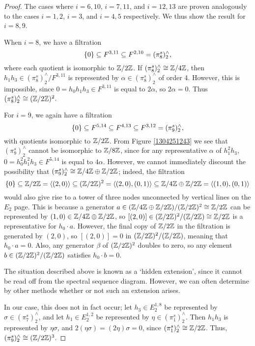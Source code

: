 \documentclass[11pt, titlepage]{article} %
\def\subq{\ensuremath\subseteq}
\def\inte{\ensuremath\mathbb{Z}}
\numberwithin{equation}{subsection}
\theoremstyle{plain}
\theoremstyle{definition}
\begin{document}
\begin{proof}
The cases where \(i=6,10\), \(i=7, 11\), and \(i=12,13\) are proven analogously to the cases \(i=1, 2\), \(i=3\), and \(i=4,5\) respectively. We thus show the result for \(i=8,9\).

When \(i=8\), we have a filtration
\[\{0\}\subq F^{3,11}\subq F^{2,10}=(\pi^s_8)^\wedge_2,\]
where each quotient is isomorphic to \(\inte/2\inte\). If \((\pi^s_8)^\wedge_2\cong \inte/4\inte\), then \(h_1h_3\in (\pi^s_8)^\wedge_2/F^{3,11}\) is represented by \(\alpha\in (\pi^s_8)^\wedge_2\) of order 4. However, this is impossible, since \(0=h_0h_1h_3\in F^{3,11}\) is equal to \(2\alpha\), so \(2\alpha=0\). Thus \((\pi^s_8)^\wedge_2 \cong (\inte/2\inte)^2\).

For \(i=9\), we again have a filtration
\[\{0\}\subq F^{5,14}\subq F^{4,13}\subq F^{3, 12}=(\pi^s_9)^\wedge_2,\]
with quotients isomorphic to \(\inte/2\inte\). From Figure \ref{1304251243} we see that \((\pi^s_9)^\wedge_2\) cannot be isomorphic to \(\inte/8\inte\), since for any representative \(\alpha\) of \(h_1^2h_3\), \(0=h_0^2h_1^2h_3\in F^{5,14}\) is equal to \(4\alpha\). However, we cannot immediately discount the possibility that \((\pi^s_9)^\wedge_2\cong \inte/4\inte\oplus \inte/2\inte\); indeed, the filtration 
\[\{0\}\subq \inte/2\inte=\ang{(2,0)} \subq (\inte/2\inte)^2=\ang{(2,0),(0,1)} \subq \inte/4\inte \oplus \inte/2\inte=\ang{(1,0), (0,1)}\]
would also give rise to a tower of three nodes unconnected by vertical lines on the \(E_2\) page. This is because a generator \(a \in (\inte/4\inte\oplus\inte/2\inte)/(\inte/2\inte)^2\cong \inte/2\inte\) can be represented by \((1,0)\in \inte/4\inte\oplus\inte/2\inte\), so \([(2,0)]\in (\inte/2\inte)^2/(\inte/2\inte)\cong \inte/2\inte\) is a representative for \(h_0\cdot a\). However, the final copy of \(\inte/2\inte\) in the filtration is generated by \((2,0)\), so \([(2,0)]=0\) in \((\inte/2\inte)^2/(\inte/2\inte)\), meaning that \(h_0\cdot a=0\). Also, any generator \(\beta\) of \((\inte/2\inte)^2\) doubles to zero, so any element \(b\in (\inte/2\inte)^2/(\inte/2\inte)\) satisfies \(h_0\cdot b =0\). 

The situation described above is known as a `hidden extension', since it cannot be read off from the spectral sequence diagram. However, we can often determine by other methods whether or not such an extension arises. 

In our case, this does not in fact occur; let \(h_3\in E_2^{1,8}\) be represented by \(\sigma\in (\pi_7^s)^\wedge_2\), and let \(h_1\in E_2^{1,2}\) be represented by \(\eta \in (\pi_1^s)^\wedge_2\). Then \(h_1h_3\) is represented by \(\eta \sigma\), and \(2(\eta \sigma)=(2\eta)\sigma=0\), since \((\pi_1^s)^\wedge_2\cong \inte/2\inte\). Thus, \((\pi_9^s)^\wedge_2\cong (\inte/2\inte)^3\). 
\end{proof}
\end{document}
